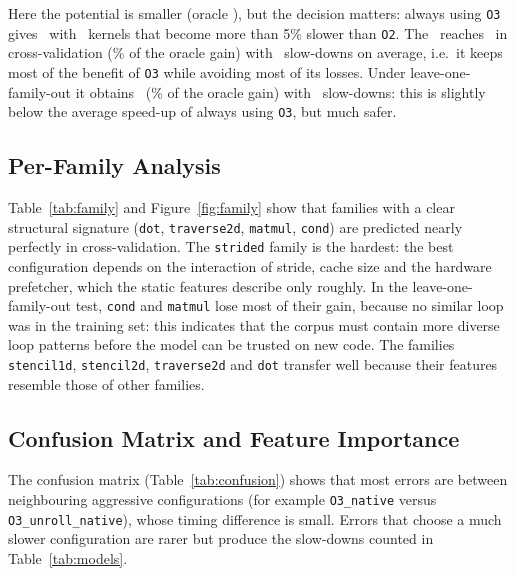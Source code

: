 

Here the potential is smaller (oracle \pOracle), but the decision matters: always using \texttt{O3} gives \pOThree\ with
\pOThreeSlow\ kernels that become more than 5\% slower than \texttt{O2}. The \selModel\ reaches \pCV\ in cross-validation
(\pFracCV\% of the oracle gain) with \pSlowCV\ slow-downs on average, i.e.\ it keeps most of the benefit of \texttt{O3} while avoiding most of its
losses. Under leave-one-family-out it obtains \pLOFO\ (\pFracLOFO\% of the oracle gain) with \pSlowLOFO\ slow-downs: this is
slightly below the average speed-up of always using \texttt{O3}, but much safer.

\subsection{Per-Family Analysis}





Table~\ref{tab:family} and Figure~\ref{fig:family} show that families with a clear structural signature
(\texttt{dot}, \texttt{traverse2d}, \texttt{matmul}, \texttt{cond}) are predicted nearly perfectly in
cross-validation. The \texttt{strided} family is the hardest: the best configuration depends on the
interaction of stride, cache size and the hardware prefetcher, which the static features describe only
roughly. In the leave-one-family-out test, \texttt{cond} and \texttt{matmul} lose most of their gain,
because no similar loop was in the training set: this indicates that the corpus must contain more
diverse loop patterns before the model can be trusted on new code. The families
\texttt{stencil1d}, \texttt{stencil2d}, \texttt{traverse2d} and \texttt{dot} transfer well because their
features resemble those of other families.

\subsection{Confusion Matrix and Feature Importance}



The confusion matrix (Table~\ref{tab:confusion}) shows that most errors are between neighbouring
aggressive configurations (for example \texttt{O3\_native} versus \texttt{O3\_unroll\_native}), whose
timing difference is small. Errors that choose a much slower configuration are rarer but produce the
slow-downs counted in Table~\ref{tab:models}.

